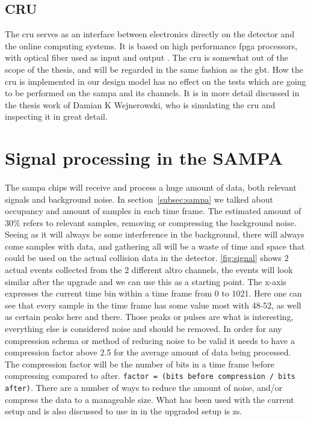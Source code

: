 \documentclass[a4paper, 12pt]{report}
\newcommand{\codeword}[1]{\texttt{#1}}
\begin{document}
\subsection{CRU}
The \gls{cru} serves as an interface between electronics directly on the detector and the online computing systems.
It is based on high performance \gls{fpga} processors, with optical fiber used as input and output \cite{tdr-015}. 
The \gls{cru} is somewhat out of the scope of the thesis, and will be regarded in the same fashion as the \gls{gbt}.
How the \gls{cru} is implemented in our design model has no effect on the tests which are going to be performed on the \gls{sampa} and its channels.
It is in more detail discussed in the thesis work of Damian K Wejnerowski, who is simulating the \gls{cru} and inspecting it in great detail.

\section{Signal processing in the SAMPA}
\paragraph{}
The \gls{sampa} chips will receive and process a huge amount of data, both relevant signals and background noise.
In section~\ref{subsec:sampa} we talked about occupancy and amount of samples in each time frame.
The estimated amount of 30\% refers to relevant samples, removing or compressing the background noise.
Seeing as it will always be some interference in the background, there will always come samples with data, and gathering all will be a waste of time and space that could be used on the actual collision data in the detector.
\ref{fig:signal} shows 2 actual events collected from the 2 different \gls{altro} channels, the events will look similar after the upgrade and we can use this as a starting point.
The x-axis expresses the current time bin within a time frame from 0 to 1021.
Here one can see that every sample in the time frame has some value most with 48-52, as well as certain peaks here and there.
Those peaks or pulses are what is interesting, everything else is considered noise and should be removed.
In order for any compression schema or method of reducing noise to be valid it needs to have a compression factor above 2.5 for the average amount of data being processed.
The compression factor will be the number of bits in a time frame before compressing compared to after. \codeword{factor = (bits before compression / bits after)}.
There are a number of ways to reduce the amount of noise, and/or compress the data to a manageable size.
What has been used with the current setup and is also discussed to use in in the upgraded setup is \gls{zs}.
\end{document}
